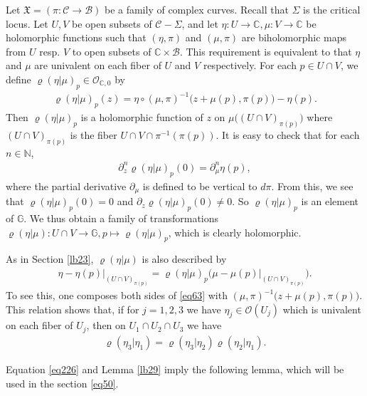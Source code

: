 \documentclass[12pt,a4paper,notitlepage]{report}
\theoremstyle{definition}
\theoremstyle{plain}
\newcommand{\fk}{\mathfrak}
\newcommand{\mc}{\mathcal}
\newcommand{\scr}{\mathscr}
\newcommand{\Gbb}{\mathbb G}
\newcommand{\Cbb}{\mathbb C}
\newcommand{\Nbb}{\mathbb N}
\numberwithin{equation}{section}
\begin{document}
Let $\fk X=(\pi:\mc C\rightarrow\mc B)$ be a family of complex curves. Recall that $\Sigma$ is the critical locus. Let $U,V$ be open subsets of $\mc C-\Sigma$, and let $\eta:U\rightarrow\Cbb,\mu:V\rightarrow\Cbb$ be holomorphic functions such that $(\eta,\pi)$ and $(\mu,\pi)$ are biholomorphic maps from $U$ resp. $V$ to open subsets of $\Cbb\times\mc B$. This requirement is equivalent to that $\eta$ and $\mu$ are univalent on each fiber of $U$ and $V$ respectively.  For each $p\in U\cap V$, we define $\varrho(\eta|\mu)_p\in\scr O_{\Cbb,0}$ by
\begin{align}
\varrho(\eta|\mu)_p(z)=\eta\circ(\mu,\pi)^{-1}\big(z+\mu(p),\pi(p)\big)-\eta(p).\label{eq62}
\end{align}
Then $\varrho(\eta|\mu)_p$ is a holomorphic function of $z$ on  $\mu\big((U\cap V)_{\pi(p)}\big)$ where $(U\cap V)_{\pi(p)}$ is the fiber $U\cap V\cap \pi^{-1}(\pi(p))$. It is easy to check that for each $n\in\Nbb$,
\begin{align}
\partial_z^n\varrho(\eta|\mu)_p(0)=\partial_\mu^n \eta(p)\label{eq226},
\end{align}
where the partial derivative $\partial_\mu$ is defined to be vertical to $d\pi$. From this, we see that $\varrho(\eta|\mu)_p(0)=0$ and  $\partial_z\varrho(\eta|\mu)_p(0)\neq0$. So $\varrho(\eta|\mu)_p$ is an element of $\Gbb$. We thus obtain a family of transformations $\varrho(\eta|\mu):U\cap V\rightarrow\Gbb,p\mapsto \varrho(\eta|\mu)_p$, which  is clearly holomorphic.

As in Section \ref{lb23}, $\varrho(\eta|\mu)$ is also described by
\begin{align}
\eta-\eta(p)\big|_{(U\cap V)_{\pi(p)}}=\varrho(\eta|\mu)_p\big(\mu-\mu(p)\big|_{(U\cap V)_{\pi(p)}}\big).\label{eq63}
\end{align}
To see this, one composes both sides of \eqref{eq63} with $(\mu,\pi)^{-1}\big(z+\mu(p),\pi(p)\big)$. This relation shows that,   if for $j=1,2,3$ we have $\eta_j\in\scr O(U_j)$ which is univalent on each fiber of $U_j$, then  on $U_1\cap U_2\cap U_3$ we have
\begin{align}
\varrho(\eta_3|\eta_1)=\varrho(\eta_3|\eta_2)\varrho(\eta_2|\eta_1).
\end{align}


Equation \eqref{eq226} and Lemma \ref{lb29} imply the following lemma, which will be used in the section \eqref{eq50}.
\end{document}
